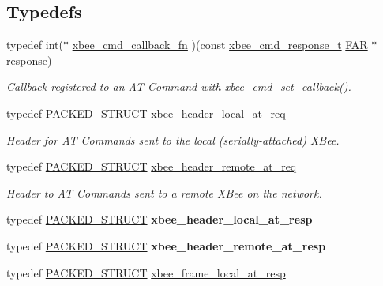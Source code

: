 \subsection*{Typedefs}
\begin{DoxyCompactItemize}
\item 
typedef int($\ast$ \hyperlink{group__xbee__atcmd_ga9c6cda2f2b7450e8ef2f6b32d9fdcb12}{xbee\-\_\-cmd\-\_\-callback\-\_\-fn} )(const \hyperlink{structxbee__cmd__response__t}{xbee\-\_\-cmd\-\_\-response\-\_\-t} \hyperlink{group__hal_gaef060b3456fdcc093a7210a762d5f2ed}{F\-A\-R} $\ast$response)
\begin{DoxyCompactList}\small\item\em Callback registered to an A\-T Command with \hyperlink{group__xbee__atcmd_ga0a5d2e2e87743061c46abd53e379e014}{xbee\-\_\-cmd\-\_\-set\-\_\-callback()}. \end{DoxyCompactList}\item 
typedef \hyperlink{group___s_x_a_ga4233297bd31be5c273d4fb0758cc54d7}{P\-A\-C\-K\-E\-D\-\_\-\-S\-T\-R\-U\-C\-T} \hyperlink{group__xbee__atcmd_ga9bf03869fc9022aadb223bfe0cbbce48}{xbee\-\_\-header\-\_\-local\-\_\-at\-\_\-req}
\begin{DoxyCompactList}\small\item\em Header for A\-T Commands sent to the local (serially-\/attached) X\-Bee. \end{DoxyCompactList}\item 
typedef \hyperlink{group___s_x_a_ga4233297bd31be5c273d4fb0758cc54d7}{P\-A\-C\-K\-E\-D\-\_\-\-S\-T\-R\-U\-C\-T} \hyperlink{group__xbee__atcmd_gad9afb37256d642019ad00c6ec75eae05}{xbee\-\_\-header\-\_\-remote\-\_\-at\-\_\-req}
\begin{DoxyCompactList}\small\item\em Header to A\-T Commands sent to a remote X\-Bee on the network. \end{DoxyCompactList}\item 
typedef \hyperlink{group___s_x_a_ga4233297bd31be5c273d4fb0758cc54d7}{P\-A\-C\-K\-E\-D\-\_\-\-S\-T\-R\-U\-C\-T} {\bfseries xbee\-\_\-header\-\_\-local\-\_\-at\-\_\-resp}
\item 
typedef \hyperlink{group___s_x_a_ga4233297bd31be5c273d4fb0758cc54d7}{P\-A\-C\-K\-E\-D\-\_\-\-S\-T\-R\-U\-C\-T} {\bfseries xbee\-\_\-header\-\_\-remote\-\_\-at\-\_\-resp}
\item 
typedef \hyperlink{group___s_x_a_ga4233297bd31be5c273d4fb0758cc54d7}{P\-A\-C\-K\-E\-D\-\_\-\-S\-T\-R\-U\-C\-T} \hyperlink{group__xbee__atcmd_ga8e4eb20c6debd4dfac4a8a81d9314e98}{xbee\-\_\-frame\-\_\-local\-\_\-at\-\_\-resp}

\end{DoxyCompactItemize}
